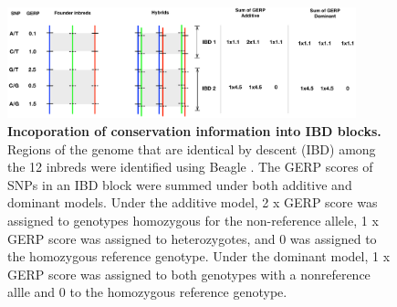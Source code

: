 \documentclass[10pt]{article}
\begin{document}
\begin{figure}[here]
\includegraphics[width=0.9\textwidth]{gerpIBD.pdf}
\caption{
\textbf{Incoporation of conservation information into IBD blocks.}
Regions of the genome that are identical by descent (IBD) among the 12 inbreds were identified using Beagle \citep{Browning2009}.  The GERP scores of SNPs in an IBD block were summed under both additive and dominant models. Under the additive model, 2 x GERP score was assigned to genotypes homozygous for the non-reference allele, 1 x GERP score was assigned to heterozygotes, and 0 was assigned to the homozygous reference genotype. Under the dominant model, 1 x GERP score was assigned to both genotypes with a nonreference allle and 0 to the homozygous reference genotype.}
\label{fig:gerpibd}
\end{figure}
\end{document}
